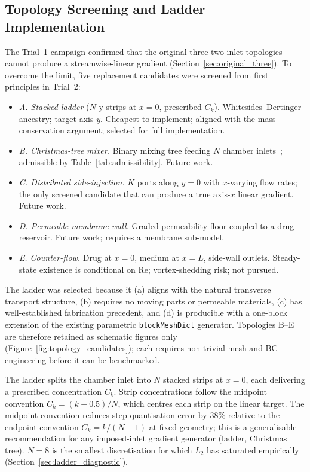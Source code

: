 \documentclass[12pt]{article}
\begin{document}
\subsection{Topology Screening and Ladder Implementation}
\label{sec:topology_screening}
The Trial~1 campaign confirmed that the original three two-inlet topologies cannot produce a streamwise-linear gradient (Section~\ref{sec:original_three}). To overcome the limit, five replacement candidates were screened from first principles in Trial~2:
\begin{itemize}
\item \emph{A. Stacked ladder} ($N$ y-strips at $x = 0$, prescribed $C_k$). Whitesides--Dertinger ancestry; target axis $y$. Cheapest to implement; aligned with the mass-conservation argument; selected for full implementation.
\item \emph{B. Christmas-tree mixer.} Binary mixing tree feeding $N$ chamber inlets~\cite{dertinger2001generation,yang2020surrogate}; admissible by Table~\ref{tab:admissibility}. Future work.
\item \emph{C. Distributed side-injection.} $K$ ports along $y = 0$ with $x$-varying flow rates; the only screened candidate that can produce a true axis-$x$ linear gradient. Future work.
\item \emph{D. Permeable membrane wall.} Graded-permeability floor coupled to a drug reservoir. Future work; requires a membrane sub-model.
\item \emph{E. Counter-flow.} Drug at $x = 0$, medium at $x = L$, side-wall outlets. Steady-state existence is conditional on Re; vortex-shedding risk; not pursued.
\end{itemize}
The ladder was selected because it (a) aligns with the natural transverse transport structure, (b) requires no moving parts or permeable materials, (c) has well-established fabrication precedent, and (d) is producible with a one-block extension of the existing parametric \texttt{blockMeshDict} generator. Topologies B--E are therefore retained as schematic figures only (Figure~\ref{fig:topology_candidates}); each requires non-trivial mesh and BC engineering before it can be benchmarked.

The ladder splits the chamber inlet into $N$ stacked strips at $x = 0$, each delivering a prescribed concentration $C_k$. Strip concentrations follow the midpoint convention $C_k = (k + 0.5)/N$, which centres each strip on the linear target. The midpoint convention reduces step-quantisation error by $38\%$ relative to the endpoint convention $C_k = k/(N-1)$ at fixed geometry; this is a generalisable recommendation for any imposed-inlet gradient generator (ladder, Christmas tree). $N = 8$ is the smallest discretisation for which $L_2$ has saturated empirically (Section~\ref{sec:ladder_diagnostic}).
\end{document}
